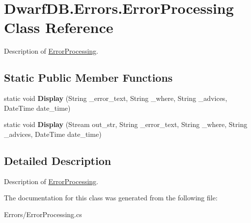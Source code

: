 \hypertarget{class_dwarf_d_b_1_1_errors_1_1_error_processing}{\section{Dwarf\+D\+B.\+Errors.\+Error\+Processing Class Reference}
\label{class_dwarf_d_b_1_1_errors_1_1_error_processing}
}


Description of \hyperlink{class_dwarf_d_b_1_1_errors_1_1_error_processing}{Error\+Processing}.  


\subsection*{Static Public Member Functions}
\begin{DoxyCompactItemize}
\item 
\hypertarget{class_dwarf_d_b_1_1_errors_1_1_error_processing_a68c6bfa1f5bf2da33703992cfed77731}{static void {\bfseries Display} (String \+\_\+error\+\_\+text, String \+\_\+where, String \+\_\+advices, Date\+Time date\+\_\+time)}\label{class_dwarf_d_b_1_1_errors_1_1_error_processing_a68c6bfa1f5bf2da33703992cfed77731}

\item 
\hypertarget{class_dwarf_d_b_1_1_errors_1_1_error_processing_aab993dd16fc5fb11db9ef496c6aa1980}{static void {\bfseries Display} (Stream out\+\_\+str, String \+\_\+error\+\_\+text, String \+\_\+where, String \+\_\+advices, Date\+Time date\+\_\+time)}\label{class_dwarf_d_b_1_1_errors_1_1_error_processing_aab993dd16fc5fb11db9ef496c6aa1980}

\end{DoxyCompactItemize}


\subsection{Detailed Description}
Description of \hyperlink{class_dwarf_d_b_1_1_errors_1_1_error_processing}{Error\+Processing}. 



The documentation for this class was generated from the following file\+:\begin{DoxyCompactItemize}
\item 
Errors/Error\+Processing.\+cs\end{DoxyCompactItemize}

